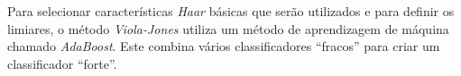 




Para selecionar características \textit{Haar} básicas que serão utilizados e para definir os limiares, o método \textit{Viola-Jones} utiliza um método de aprendizagem de máquina chamado \textit{AdaBoost}. Este combina vários classificadores ``fracos'' para criar um classificador ``forte''. 

